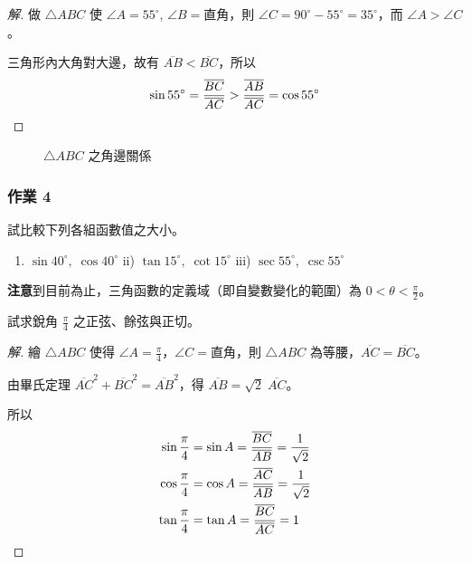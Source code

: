 \begin{proof}[解]
做 $\triangle ABC$ 使 $\angle A = 55^\circ$, $\angle B = \text{直角}$，則 $\angle C = 90^\circ - 55^\circ = 35^\circ$，而 $\angle A > \angle C$。

三角形內大角對大邊，故有 $\overline{AB} < \overline{BC}$，所以
\[ \sin 55^\circ = \frac{\overline{BC}}{\overline{AC}} > \frac{\overline{AB}}{\overline{AC}} = \cos 55^\circ \qedhere \]
\end{proof}

\begin{figure}[H]
\centering
{}
\caption{$\triangle ABC$ 之角邊關係}
\label{fig:b3-fig2-20}
\end{figure}

\subsubsection*{作業 4}
試比較下列各組函數值之大小。
\begin{enumerate}[label=\roman*), leftmargin=2.5em]
  \item $\sin 40^\circ,\; \cos 40^\circ$ \qquad ii) $\tan 15^\circ,\; \cot 15^\circ$ \qquad iii) $\sec 55^\circ,\; \csc 55^\circ$
\end{enumerate}

\textbf{注意}\quad 到目前為止，三角函數的定義域（即自變數變化的範圍）為 $0 < \theta < \frac{\pi}{2}$。

\begin{example}
試求銳角 $\frac{\pi}{4}$ 之正弦、餘弦與正切。
\end{example}

\begin{proof}[解]
繪 $\triangle ABC$ 使得 $\angle A = \frac{\pi}{4}$，$\angle C = \text{直角}$，則 $\triangle ABC$ 為等腰，$\overline{AC} = \overline{BC}$。

由畢氏定理 $\overline{AC}^2 + \overline{BC}^2 = \overline{AB}^2$，得 $\overline{AB} = \sqrt{2}\;\overline{AC}$。

所以
\begin{align*}
\sin\frac{\pi}{4} &= \sin A = \frac{\overline{BC}}{\overline{AB}} = \frac{1}{\sqrt{2}} \\
\cos\frac{\pi}{4} &= \cos A = \frac{\overline{AC}}{\overline{AB}} = \frac{1}{\sqrt{2}} \\
\tan\frac{\pi}{4} &= \tan A = \frac{\overline{BC}}{\overline{AC}} = 1 \qedhere
\end{align*}
\end{proof}

